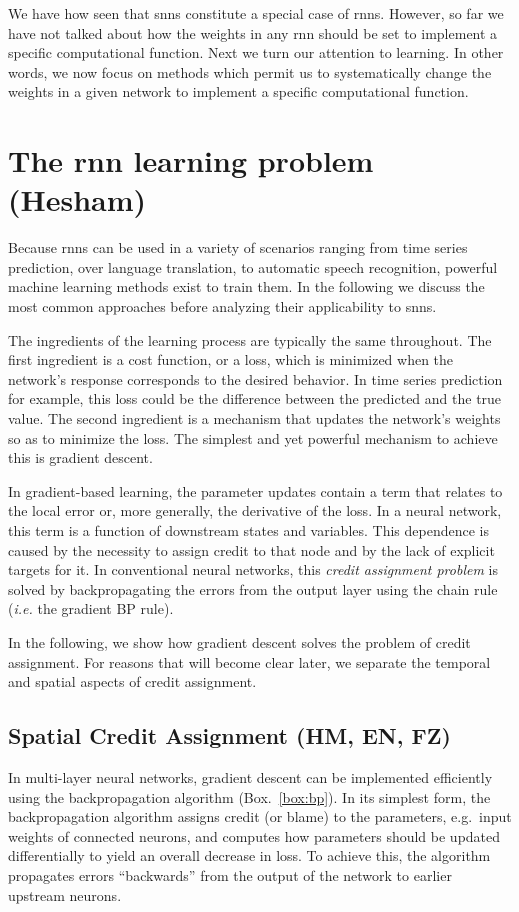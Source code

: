 \documentclass[journal,onecolumn,11pt]{IEEEtran}
\newcommand{\refbox}[1]{{\color{blue!70}(Box.~\ref{#1})}}
\begin{document}
We have how seen that \glspl{snn} constitute a special case of \glspl{rnn}.
However, so far we have not talked about how the weights in any \gls{rnn} should be set to implement a specific computational function.
Next we turn our attention to learning. 
In other words, we now focus on methods which permit us to systematically change the weights in a given network to implement a specific computational function.


\section{The \gls{rnn} learning problem (Hesham)}
Because \glspl{rnn} can be used in a variety of scenarios ranging from time series prediction, over language translation, to automatic speech recognition, powerful machine learning methods exist to train them. 
In the following we discuss the most common approaches before analyzing their applicability to \glspl{snn}.

The ingredients of the learning process are typically the same throughout.
The first ingredient is a cost function, or a loss, which is minimized when the network's response corresponds to the desired behavior.
In time series prediction for example, this loss could be the difference between the predicted and the true value.
The second ingredient is a mechanism that updates the network's weights so as to minimize the loss.
The simplest and yet powerful mechanism to achieve this is gradient descent.

In gradient-based learning, the parameter updates contain a term that relates to the local error or, more generally, the derivative of the loss.
In a neural network, this term is a function of downstream states and variables.
This dependence is caused by the necessity to assign credit to that node and by the lack of explicit targets for it.
In conventional neural networks, this \emph{credit assignment problem} is solved by backpropagating the errors from the output layer using the chain rule (\emph{i.e.} the gradient BP rule).

In the following, we show how gradient descent solves the problem of credit assignment. 
For reasons that will become clear later, we separate the temporal and spatial aspects of credit assignment.

\subsection{Spatial Credit Assignment (HM, EN, FZ)}
\label{sec:spatial_CA}
In multi-layer neural networks, gradient descent can be implemented efficiently using the backpropagation algorithm \refbox{box:bp}. 
In its simplest form, the backpropagation algorithm 
assigns credit (or blame) to the parameters, e.g.\ input weights of connected neurons, and computes how parameters should be updated differentially to yield an overall decrease in loss.
To achieve this, the algorithm propagates errors ``backwards'' from the output of the network to earlier upstream neurons.
\end{document}

